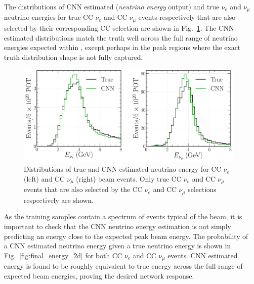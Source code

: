 The distributions of CNN estimated (\emph{neutrino energy} output) and true $\nu_{e}$ and
$\nu_{\mu}$ neutrino energies for true CC $\nu_{e}$ and CC $\nu_{\mu}$ events respectively that
are also selected by their corresponding CC selection are shown in
Fig.~\ref{fig:final_energy_dists}. The CNN estimated distributions match the truth well across the
full range of neutrino energies expected within \chipsfive, except perhaps in the peak regions
where the exact truth distribution shape is not fully captured.

\begin{figure} %
    \includegraphics[width=\textwidth]{diagrams/7-results/final_energy_dists.pdf}
    \caption[Distributions of true and CNN estimated neutrino energy]
    {Distributions of true and CNN estimated neutrino energy for CC $\nu_{e}$ (left) and CC
        $\nu_{\mu}$ (right) beam events. Only true CC $\nu_{e}$ and CC $\nu_{\mu}$ events that are
        also selected by the CC $\nu_{e}$ and CC $\nu_{\mu}$ selections respectively are shown.}
    \label{fig:final_energy_dists}
\end{figure}

As the training samples contain a spectrum of events typical of the beam, it is important to check
that the CNN neutrino energy estimation is not simply predicting an energy close to the expected
peak beam energy. The probability of a CNN estimated neutrino energy given a true neutrino energy
is shown in Fig.~\ref{fig:final_energy_2d} for both CC $\nu_{e}$ and CC $\nu_{\mu}$ events. CNN
estimated energy is found to be roughly equivalent to true energy across the full range of
expected \chipsfive beam energies, proving the desired network response.

